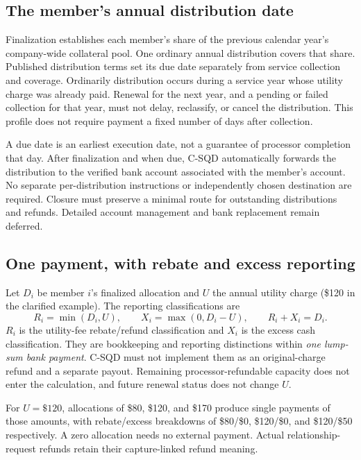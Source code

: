 \documentclass[11pt]{article}
\begin{document}
\subsection{The member's annual distribution date}

Finalization establishes each member's share of the previous calendar year's
company-wide collateral pool. One ordinary annual distribution covers that share.
Published distribution terms set its due date separately from service collection
and coverage. Ordinarily distribution occurs during a service year whose utility
charge was already paid. Renewal for the next year, and a pending or failed
collection for that year, must not delay, reclassify, or cancel the distribution.
This profile does not require payment a fixed number of days after collection.

A due date is an earliest execution date, not a guarantee of processor completion
that day. After finalization and when due, C-SQD automatically forwards the
distribution to the verified bank account associated with the member's account.
No separate per-distribution instructions or independently chosen destination
are required. Closure must preserve a minimal route for outstanding distributions
and refunds. Detailed account management and bank replacement remain deferred.

\subsection{One payment, with rebate and excess reporting}

Let $D_i$ be member $i$'s finalized allocation and $U$ the annual utility charge
(\$120 in the clarified example). The reporting classifications are
\[
R_i=\min(D_i,U),\qquad X_i=\max(0,D_i-U),\qquad R_i+X_i=D_i.
\]
$R_i$ is the utility-fee rebate/refund classification and $X_i$ is the excess
cash classification. They are bookkeeping and reporting distinctions within
\emph{one lump-sum bank payment}. C-SQD must not implement them as an original-charge
refund and a separate payout. Remaining processor-refundable capacity does not
enter the calculation, and future renewal status does not change $U$.

For $U=\$120$, allocations of \$80, \$120, and \$170 produce single payments
of those amounts, with rebate/excess breakdowns of \$80/\$0, \$120/\$0,
and \$120/\$50 respectively. A zero allocation needs no external payment.
Actual relationship-request refunds retain their capture-linked refund meaning.
\end{document}
